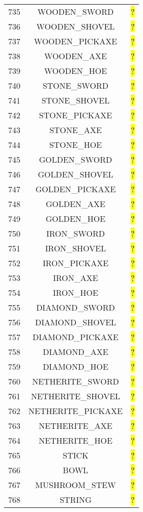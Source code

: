 \documentclass[11pt]{article}
\newcommand\myworries[1]{\sethlcolor{red}\hl{#1}}
\begin{document}
\begin{longtable}{ |c|c|c| }
735 & WOODEN\_SWORD & \myworries{?} \\
736 & WOODEN\_SHOVEL & \myworries{?} \\
737 & WOODEN\_PICKAXE & \myworries{?} \\
738 & WOODEN\_AXE & \myworries{?} \\
739 & WOODEN\_HOE & \myworries{?} \\
740 & STONE\_SWORD & \myworries{?} \\
741 & STONE\_SHOVEL & \myworries{?} \\
742 & STONE\_PICKAXE & \myworries{?} \\
743 & STONE\_AXE & \myworries{?} \\
744 & STONE\_HOE & \myworries{?} \\
745 & GOLDEN\_SWORD & \myworries{?} \\
746 & GOLDEN\_SHOVEL & \myworries{?} \\
747 & GOLDEN\_PICKAXE & \myworries{?} \\
748 & GOLDEN\_AXE & \myworries{?} \\
749 & GOLDEN\_HOE & \myworries{?} \\
750 & IRON\_SWORD & \myworries{?} \\
751 & IRON\_SHOVEL & \myworries{?} \\
752 & IRON\_PICKAXE & \myworries{?} \\
753 & IRON\_AXE & \myworries{?} \\
754 & IRON\_HOE & \myworries{?} \\
755 & DIAMOND\_SWORD & \myworries{?} \\
756 & DIAMOND\_SHOVEL & \myworries{?} \\
757 & DIAMOND\_PICKAXE & \myworries{?} \\
758 & DIAMOND\_AXE & \myworries{?} \\
759 & DIAMOND\_HOE & \myworries{?} \\
760 & NETHERITE\_SWORD & \myworries{?} \\
761 & NETHERITE\_SHOVEL & \myworries{?} \\
762 & NETHERITE\_PICKAXE & \myworries{?} \\
763 & NETHERITE\_AXE & \myworries{?} \\
764 & NETHERITE\_HOE & \myworries{?} \\
765 & STICK & \myworries{?} \\
766 & BOWL & \myworries{?} \\
767 & MUSHROOM\_STEW & \myworries{?} \\
768 & STRING & \myworries{?} \\

\end{longtable}
\end{document}
